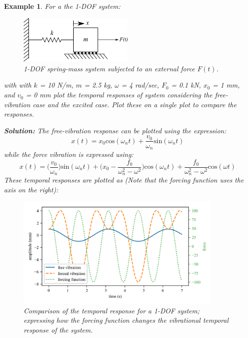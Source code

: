 \documentclass[12pt,letter]{article}
\newtheorem{ex}{Example}
\numberwithin{ex}{section} %
\newenvironment{example}{\begin{mdframed}[middlelinewidth=0.5mm]\begin{ex}\normalfont}{\end{ex}\end{mdframed}}
\numberwithin{re}{section} %
\begin{document}
			\begin{example}
				For a the 1-DOF system:
				\begin{figure}[H]
					\centering
					\includegraphics[width=0.5\textwidth]{../Figures/1-DOF-spring_mass_horizontal_forced.png}
					\caption{1-DOF spring-mass system subjected to an external force $F(t)$.}
				\end{figure}
				with with $k$ = 10 N/m, $m$ = 2.5 kg, $\omega$ = 4 rad/sec, $F_0$ = 0.1 kN, $x_0$ = 1 mm, and $v_0$ = 0 mm plot the temporal responses of system considering the free-vibration case and the excited case. Plot these on a single plot to compare the responses. 
							
				\noindent\textbf{Solution:} The free-vibration response can be plotted using the expression:
				\begin{equation}
					x(t) = x_0\text{cos}(\omega_n t) + \frac{v_0}{\omega_n}\text{sin}(\omega_n t)
				\end{equation}				
				while the force vibration is expressed using:
				\begin{equation}
					x(t) = \Big(\frac{v_0}{\omega_n}\Big)\text{sin}(\omega_n t) + \Big(x_0-\frac{f_0}{\omega_n^2-\omega^2}\Big)\text{cos}(\omega_n t) + \frac{f_0}{\omega_n^2-\omega^2}\text{cos}(\omega t)
				\end{equation}	
				These temporal responses are plotted as (Note that the forcing function uses the axis on the right):
				\begin{figure}[H]
					\centering
					\includegraphics[width=0.9\textwidth]{../Figures/free_and_forced_temporal_response.png}
					\caption{Comparison of the temporal response for a 1-DOF system; expressing how the forcing function changes the vibrational  temporal response of the system.}
				\end{figure}	
			\end{example}
			
\end{document}
